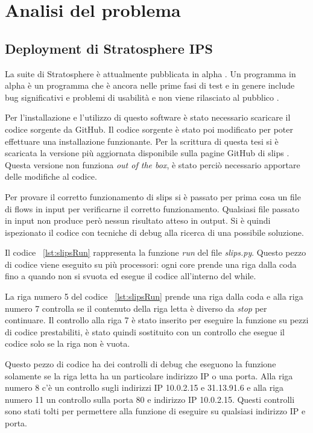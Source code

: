 \documentclass[../main.tex]{subfiles}
\begin{document}
\section{Analisi del problema}

\subsection{Deployment di Stratosphere IPS}
La suite di Stratosphere è attualmente pubblicata in alpha \cite{stratosphereSuite}. Un programma in alpha è un programma che è ancora nelle prime fasi di test e in genere include bug significativi e problemi di usabilità e non viene rilasciato al pubblico \cite{alpha}.

Per l'installazione e l'utilizzo di questo software è stato necessario scaricare il codice sorgente da GitHub. Il codice sorgente è stato poi modificato per poter effettuare una installazione funzionante.
Per la scrittura di questa tesi si è scaricata la versione più aggiornata disponibile sulla pagine GitHub di slips \cite{slipscurrent}. Questa versione non funziona \textit{out of the box}, è stato perciò necessario apportare delle modifiche al codice.

Per provare il corretto funzionamento di slips si è passato per prima cosa un file di flows in input per verificarne il corretto funzionamento. Qualsiasi file passato in input non produce però nessun risultato atteso in output. Si è quindi ispezionato il codice con tecniche di debug alla ricerca di una possibile soluzione.

Il codice ~\ref{lst:slipsRun} rappresenta la funzione \textit{run} del file \textit{slips.py}. Questo pezzo di codice viene eseguito su più processori: ogni core prende una riga dalla coda fino a quando non si svuota ed esegue il codice all'interno del while.

La riga numero 5 del codice ~\ref{lst:slipsRun} prende una riga dalla coda e alla riga numero 7 controlla se il contenuto della riga letta è diverso da \textit{stop} per continuare. Il controllo alla riga 7 è stato inserito per eseguire la funzione su pezzi di codice prestabiliti, è stato quindi sostituito con un controllo che esegue il codice solo se la riga non è vuota.

Questo pezzo di codice ha dei controlli di debug che eseguono la funzione solamente se la riga letta ha un particolare indirizzo IP o una porta. Alla riga numero 8 c'è un controllo sugli indirizzi IP 10.0.2.15 e 31.13.91.6 e alla riga numero 11 un controllo sulla porta 80 e indirizzo IP 10.0.2.15. Questi controlli sono stati tolti per permettere alla funzione di eseguire su qualsiasi indirizzo IP e porta.
\end{document}
